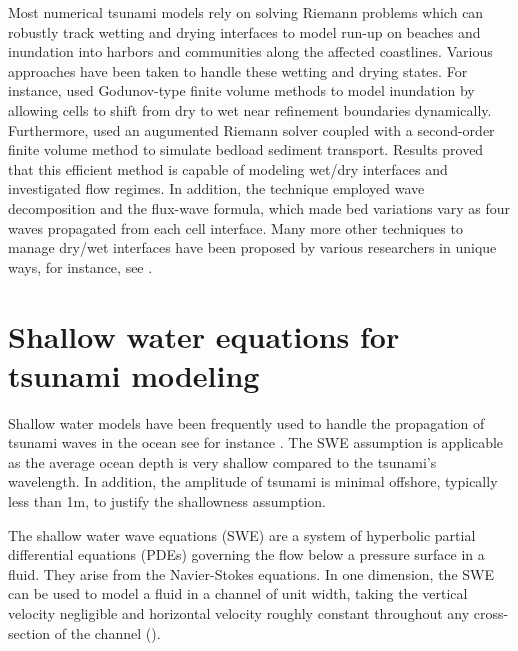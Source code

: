 \documentclass[10pt,a4paper]{article}
\begin{document}
				Most numerical tsunami models rely on solving Riemann problems which can robustly track wetting and drying interfaces to model run-up on beaches and inundation into harbors and communities along the affected coastlines.  Various approaches have been taken to handle these wetting and drying states. For instance, \citet{ge:2011,li-ta-wa-ca-ba-ch-li:2021,fivser2016mass} used Godunov-type finite volume methods to model inundation by allowing cells to shift from dry to wet near refinement boundaries dynamically. Furthermore, \citet{barzgaran2019numerical}  used an augumented Riemann solver coupled with a second-order finite volume method to simulate bedload sediment transport. Results proved that this efficient method is capable of modeling wet/dry interfaces and investigated flow regimes. In addition, the technique employed wave decomposition and the flux-wave formula, which made bed variations vary as four waves propagated from each cell interface. Many more other techniques to manage dry/wet interfaces have been proposed by various researchers in unique ways, for instance, see \citet{po:2015, po:2018, pe-bo-ma:2011, toro2001shock, chaabelasri1849simple,nikolos2009unstructured,huang2013well, bi2014finite,song2011unstructured,buttinger2019fast}.
		

	\section{Shallow water equations for tsunami modeling}
	\label{sec2}
	Shallow water models have been frequently used to handle the propagation of tsunami waves in the ocean see for instance \citet{dutykh2007water,le-ge-be:2011,dias2007dynamics}. The SWE assumption is applicable as the average ocean depth is very shallow compared to the tsunami's wavelength. In addition, the amplitude of tsunami is minimal offshore, typically less than 1m, to justify the shallowness assumption. 
	
		The shallow water wave equations (SWE) are a system of hyperbolic partial differential equations (PDEs) governing the flow below a pressure surface in a fluid. They arise from the Navier-Stokes equations.  In one dimension, the SWE  can be used to model a fluid in a channel of unit width, taking the vertical velocity negligible and horizontal velocity roughly constant throughout any cross-section of the channel (\cite{ge:2008}).  
		
\end{document}
